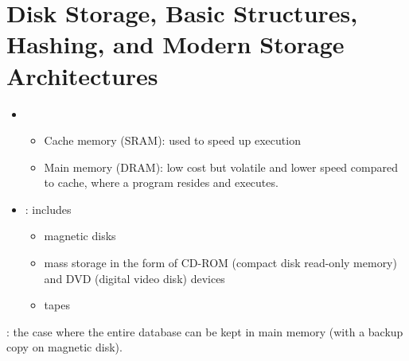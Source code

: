 \chapter{Disk Storage, Basic Structures, Hashing, and Modern Storage Architectures}


      \begin{itemize}
        \item {}
          \begin{itemize}
            \item Cache memory (SRAM): used to speed up execution
            \item Main memory (DRAM): low cost but volatile and lower speed
              compared to cache, where a program resides and executes.
          \end{itemize}
        \item {}: includes
          \begin{itemize}
            \item magnetic disks
            \item mass storage in the form of CD-ROM (compact disk read-only
              memory) and DVD (digital video disk) devices
            \item tapes
          \end{itemize}
      \end{itemize}
      \par {}: the case where the entire database can be kept in main memory
  (with a backup copy on magnetic disk).

